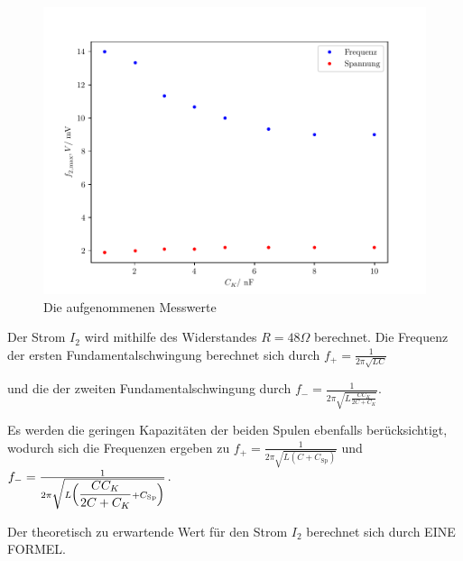 \begin{figure}
  \centering
  \includegraphics{freq2.pdf}
  \caption{Die aufgenommenen Messwerte}
  \label{fig:freq2}
\end{figure}


Der Strom $I_2$ wird mithilfe des Widerstandes $R=48\Omega$ berechnet.
Die Frequenz der ersten Fundamentalschwingung berechnet sich durch %
$f_+ = \frac{1}{2\pi\sqrt{LC}}$ 

und die der zweiten Fundamentalschwingung durch 
$f_- = \frac{1}{2\pi\sqrt{L\frac{CC_K}{2C+C_K}}}$. 

Es werden die geringen Kapazitäten der beiden Spulen ebenfalls berücksichtigt, wodurch sich die Frequenzen ergeben zu \newline
$f_+ = \frac{1}{2\pi\sqrt{L(C + C_\text{Sp})}}$ und \newline $f_- = \frac{1}{2\pi\sqrt{L\Bigl(\dfrac{CC_K}{2C+C_K} + C_\text{Sp}\Bigr)}}$. 

Der theoretisch zu erwartende Wert für den Strom $I_2$ berechnet sich durch EINE FORMEL. 


